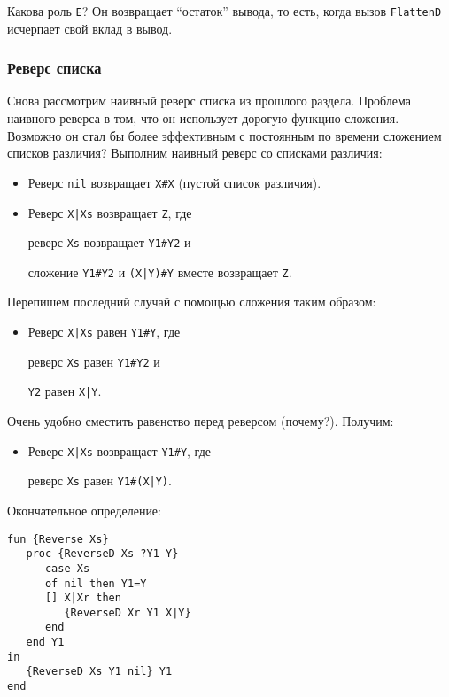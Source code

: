 Какова роль \lstinline!E!? Он возвращает ``остаток'' вывода, то есть, когда вызов \lstinline!FlattenD! исчерпает свой вклад в вывод.

\subsubsection{Реверс списка}

Снова рассмотрим наивный реверс списка из прошлого раздела. Проблема наивного реверса в том, что он использует дорогую функцию сложения. Возможно он стал бы более эффективным с постоянным по времени сложением списков различия? Выполним наивный реверс со списками различия:

\begin{itemize}
\item{Реверс \lstinline!nil! возвращает \lstinline|X#X| (пустой список различия).}

\item{Реверс \lstinline!X|Xs! возвращает \lstinline!Z!, где

  реверс \lstinline!Xs! возвращает \lstinline|Y1#Y2| и
  
  сложение \lstinline|Y1#Y2| и \lstinline!(X|Y)#Y! вместе возвращает \lstinline!Z!.}
\end{itemize}

Перепишем последний случай с помощью сложения таким образом:

\begin{itemize}
\item{Реверс \lstinline!X|Xs! равен \lstinline|Y1#Y|, где

  реверс \lstinline!Xs! равен \lstinline|Y1#Y2| и
  
  \lstinline!Y2! равен \lstinline!X|Y!.}
\end{itemize}

Очень удобно сместить равенство перед реверсом (почему?). Получим:

\begin{itemize}
\item{Реверс \lstinline!X|Xs! возвращает \lstinline|Y1#Y|, где

  реверс \lstinline!Xs! равен \lstinline!Y1#(X|Y)!.}
\end{itemize}

Окончательное определение:

\begin{lstlisting}
fun {Reverse Xs}
   proc {ReverseD Xs ?Y1 Y}
      case Xs
      of nil then Y1=Y
      [] X|Xr then
         {ReverseD Xr Y1 X|Y}
      end
   end Y1
in
   {ReverseD Xs Y1 nil} Y1
end
\end{lstlisting}

